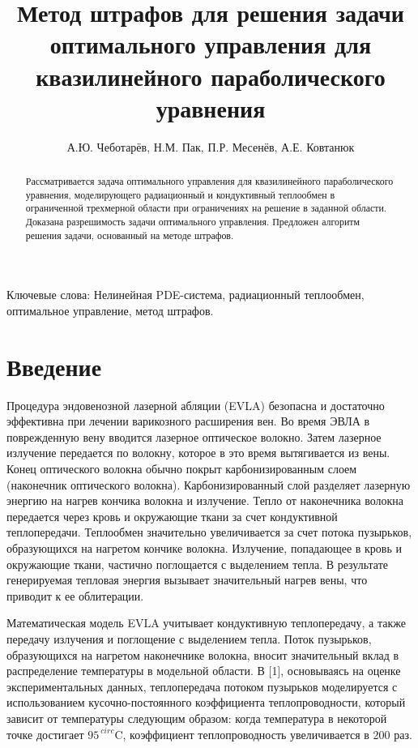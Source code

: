 \documentclass[10pt]{article}
\title{Метод штрафов для решения задачи оптимального управления для квазилинейного параболического уравнения}
\author{А.Ю. Чеботарёв, Н.М. Пак, П.Р. Месенёв, А.Е. Ковтанюк}
\date{}
\begin{document}
    \maketitle
    \begin{abstract}
        Рассматривается задача оптимального управления для квазилинейного параболического уравнения,
        моделирующего радиационный и кондуктивный теплообмен в ограниченной трехмерной области при
        ограничениях на решение в заданной области.
        Доказана разрешимость задачи оптимального управления.
        Предложен алгоритм решения задачи, основанный на методе штрафов.
    \end{abstract}

    Ключевые слова: Нелинейная PDE-система, радиационный теплообмен, оптимальное управление, метод штрафов.


    \section{Введение}
    Процедура эндовенозной лазерной абляции (EVLA) безопасна и достаточно эффективна при
    лечении варикозного расширения вен.
    Во время ЭВЛА в поврежденную вену вводится лазерное оптическое волокно.
    Затем лазерное излучение передается по волокну, которое в это время вытягивается из вены.
    Конец оптического волокна обычно покрыт карбонизированным слоем (наконечник оптического волокна).
    Карбонизированный слой разделяет лазерную энергию на нагрев кончика волокна и излучение.
    Тепло от наконечника волокна передается через кровь и окружающие ткани за счет кондуктивной теплопередачи.
    Теплообмен значительно увеличивается за счет потока пузырьков, образующихся на нагретом кончике волокна.
    Излучение, попадающее в кровь и окружающие ткани, частично поглощается с выделением тепла.
    В результате генерируемая тепловая энергия вызывает значительный нагрев вены, что приводит к ее облитерации.


    Математическая модель EVLA учитывает кондуктивную теплопередачу, а также передачу излучения
    и поглощение с выделением тепла.
    Поток пузырьков, образующихся на нагретом наконечнике волокна,
    вносит значительный вклад в распределение температуры в модельной области.
    В [1], основываясь на оценке экспериментальных данных, теплопередача потоком пузырьков моделируется
    с использованием кусочно-постоянного коэффициента теплопроводности, который зависит от температуры
    следующим образом: когда температура в некоторой точке достигает $95 ^ {\ circ} \mathrm {C}$,
    коэффициент теплопроводность увеличивается в 200 раз.
\end{document}
